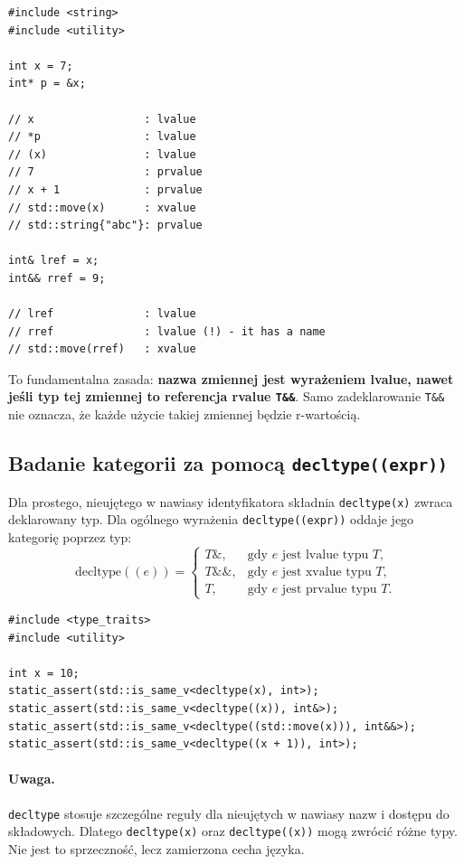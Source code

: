 \begin{lstlisting}
#include <string>
#include <utility>

int x = 7;
int* p = &x;

// x                 : lvalue
// *p                : lvalue
// (x)               : lvalue
// 7                 : prvalue
// x + 1             : prvalue
// std::move(x)      : xvalue
// std::string{"abc"}: prvalue

int& lref = x;
int&& rref = 9;

// lref              : lvalue
// rref              : lvalue (!) - it has a name
// std::move(rref)   : xvalue
\end{lstlisting}

To fundamentalna zasada: \textbf{nazwa zmiennej jest wyrażeniem lvalue,
nawet jeśli typ tej zmiennej to referencja rvalue \texttt{T\&\&}}.
Samo zadeklarowanie \texttt{T\&\&} nie oznacza, że każde użycie takiej
zmiennej będzie r-wartością.

\subsection{Badanie kategorii za pomocą \texttt{decltype((expr))}}

Dla prostego, nieujętego w nawiasy identyfikatora składnia
\texttt{decltype(x)} zwraca deklarowany typ. Dla ogólnego wyrażenia
\texttt{decltype((expr))} oddaje jego kategorię poprzez typ:
\[
\mathrm{decltype}((e))=
\left\{
\begin{array}{ll}
T\&, & \mbox{gdy } e \mbox{ jest lvalue typu } T,\\
T\&\&, & \mbox{gdy } e \mbox{ jest xvalue typu } T,\\
T, & \mbox{gdy } e \mbox{ jest prvalue typu } T.
\end{array}
\right.
\]

\begin{lstlisting}
#include <type_traits>
#include <utility>

int x = 10;
static_assert(std::is_same_v<decltype(x), int>);
static_assert(std::is_same_v<decltype((x)), int&>);
static_assert(std::is_same_v<decltype((std::move(x))), int&&>);
static_assert(std::is_same_v<decltype((x + 1)), int>);
\end{lstlisting}

\paragraph{Uwaga.} \texttt{decltype} stosuje szczególne reguły dla
nieujętych w nawiasy nazw i dostępu do składowych. Dlatego
\texttt{decltype(x)} oraz \texttt{decltype((x))} mogą zwrócić
różne typy. Nie jest to sprzeczność, lecz zamierzona cecha języka.


